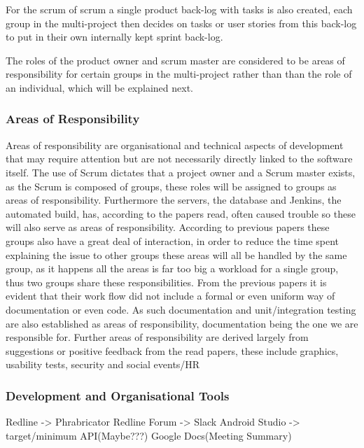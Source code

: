 For the scrum of scrum a single product back-log with tasks is also created, each group in the multi-project then decides on tasks or user stories from this back-log to put in their own internally kept sprint back-log.

The roles of the product owner and scrum master are considered to be areas of responsibility for certain groups in the multi-project rather than than the role of an individual, which will be explained next.

\subsubsection*{Areas of Responsibility}
Areas of responsibility are organisational and technical aspects of development that may require attention but are not necessarily directly linked to the software itself.
The use of Scrum dictates that a project owner and a Scrum master exists, as the Scrum is composed of groups, these roles will be assigned to groups as areas of responsibility.
Furthermore the servers, the database and Jenkins, the automated build, has, according to the papers read, often caused trouble so these will also serve as areas of responsibility.
According to previous papers these groups also have a great deal of interaction, in order to reduce the time spent explaining the issue to other groups these areas will all be handled by the same group, as it happens all the areas is far too big a workload for a single group, thus two groups share these responsibilities.
From the previous papers it is evident that their work flow did not include a formal or even uniform way of documentation or even code.
As such documentation and unit/integration testing are also established as areas of responsibility, documentation being the one we are responsible for.
Further areas of responsibility are derived largely from suggestions or positive feedback from the read papers, these include graphics, usability tests, security and social events/HR

\subsubsection*{Development and Organisational Tools}
Redline -> Phrabricator
Redline Forum -> Slack
Android Studio -> target/minimum API(Maybe???)
Google Docs(Meeting Summary)
